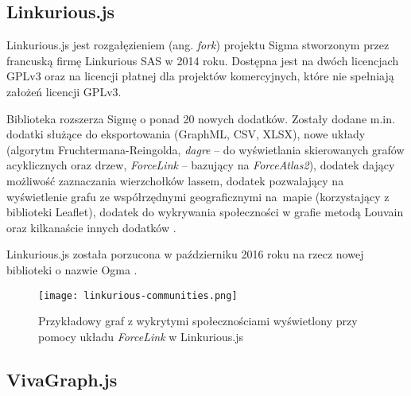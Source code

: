 \subsection{Linkurious.js}

Linkurious.js jest rozgałęzieniem (ang. \textit{fork}) projektu Sigma stworzonym przez francuską firmę Linkurious SAS w 2014 roku. Dostępna jest na dwóch licencjach GPLv3 oraz na licencji płatnej dla projektów komercyjnych, które nie spełniają założeń licencji GPLv3. 

Biblioteka rozszerza Sigmę o ponad 20 nowych dodatków. Zostały dodane m.in. dodatki służące do eksportowania (GraphML, CSV, XLSX), nowe układy (algorytm Fruchtermana-Reingolda, \textit{dagre} -- do wyświetlania skierowanych grafów acyklicznych oraz drzew, \textit{ForceLink} -- bazujący na \textit{ForceAtlas2}), dodatek dający możliwość zaznaczania wierzchołków lassem, dodatek pozwalający na wyświetlenie grafu ze współrzędnymi geograficznymi na~mapie (korzystający z biblioteki Leaflet), dodatek do wykrywania społeczności w grafie metodą Louvain oraz kilkanaście innych dodatków \cite{linkurious-diff}. 

Linkurious.js została porzucona w październiku 2016 roku na rzecz nowej biblioteki o nazwie Ogma \cite{ogma}.

\bigskip

\begin{figure}[H]
\centering
\texttt{[image: linkurious-communities.png]}
\captionsetup{justification=centering}
\caption{Przykładowy graf z wykrytymi społecznościami wyświetlony przy pomocy układu \textit{ForceLink} w Linkurious.js}\label{fig:cytoscape}
\end{figure}

\bigskip

\subsection{VivaGraph.js}



